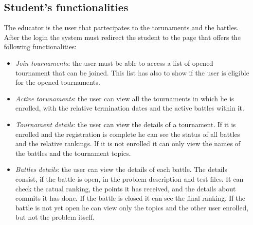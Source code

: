 \documentclass[12pt, a4paper]{report}
\begin{document}
    \subsection{Student's functionalities}
    The educator is the user that partecipates to the torunaments and the battles. 
    After the login the system must redirect the student to the page that offers the following functionalities: 
    \begin{itemize}
        \item \textit{Join tournaments}: the user must be able to access a list of opened tournament that can be joined. 
            This list has also to show if the user is eligible for the opened tournaments. 
        \item \textit{Active torunaments}: the user can view all the tournaments in which he is enrolled, with the relative termination dates and the active battles within it. 
        \item \textit{Tournament details}: the user can view the details of a tournament. 
            If it is enrolled and the registration is complete he can see the status of all battles and the relative rankings. 
            If it is not enrolled it can only view the names of the battles and the tournament topics. 
        \item \textit{Battles details}: the user can view the details of each battle. 
            The details consist, if the battle is open, in the problem description and test files. 
            It can check the catual ranking, the points it has received, and the details about commits it has done. 
            If the battle is closed it can see the final ranking.
            If the battle is not yet open he can view only the topics and the other user enrolled, but not the problem itself. 
    \end{itemize}
\end{document}
